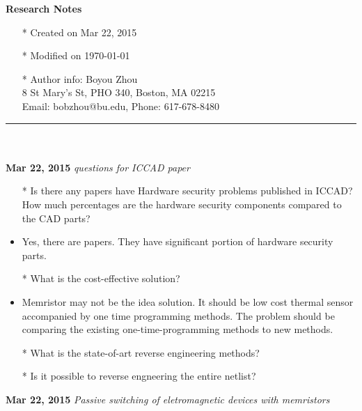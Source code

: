 \documentclass[]{article}
\begin{document}
\pagestyle{empty}
{\large\textbf{Research Notes}}
\begin{itemize}
    \item[*] Created on Mar 22, 2015
    \item[*] Modified on \today
    \item[*] Author info: Boyou Zhou\\
             8 St Mary's St, PHO 340, Boston, MA 02215\\
             Email: bobzhou@bu.edu, Phone: 617-678-8480
\end{itemize}


\rule[-0.1cm]{7.5in}{0.01cm}\\
\\

\noindent \textbf{Mar 22, 2015}
\textit{questions for ICCAD paper}
\indent		\begin{itemize}
                \item [*] Is there any papers have Hardware security problems
                published in ICCAD? How much percentages are the hardware
                security components compared to the CAD parts?
                \item Yes, there are papers. They have significant portion
                of hardware security parts.
                \item [*] What is the cost-effective solution?
                \item Memristor may not be the idea solution. It should be low
                cost thermal sensor accompanied by one time programming methods.
                The problem should be comparing the existing
                one-time-programming methods to new methods.
                \item [*] What is the state-of-art reverse engineering methods?
                \item [*] Is it possible to reverse engneering the entire
                netlist?
                
        \end{itemize}
\noindent \textbf{Mar 22, 2015}
\textit{Passive switching of eletromagnetic devices with memristors}
\end{document}

